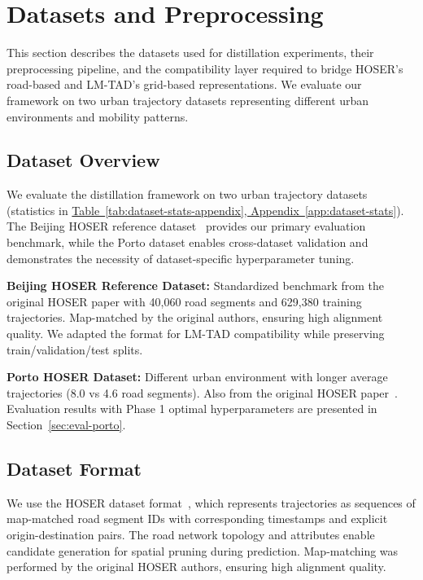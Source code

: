 
\section{Datasets and Preprocessing}
\label{sec:data-preprocessing}

This section describes the datasets used for distillation experiments, their preprocessing pipeline, and the compatibility layer required to bridge HOSER's road-based and LM-TAD's grid-based representations. We evaluate our framework on two urban trajectory datasets representing different urban environments and mobility patterns.

\subsection{Dataset Overview}
\label{sec:data-overview}

We evaluate the distillation framework on two urban trajectory datasets (statistics in \hyperref[app:dataset-stats]{Table~\ref*{tab:dataset-stats-appendix}, Appendix~\ref*{app:dataset-stats}}). The Beijing HOSER reference dataset~\cite{caoHolisticSemanticRepresentation2025} provides our primary evaluation benchmark, while the Porto dataset enables cross-dataset validation and demonstrates the necessity of dataset-specific hyperparameter tuning.

\textbf{Beijing HOSER Reference Dataset:} Standardized benchmark from the original HOSER paper with 40,060 road segments and 629,380 training trajectories. Map-matched by the original authors, ensuring high alignment quality. We adapted the format for LM-TAD compatibility while preserving train/validation/test splits.

\textbf{Porto HOSER Dataset:} Different urban environment with longer average trajectories (8.0 vs 4.6 road segments). Also from the original HOSER paper~\cite{caoHolisticSemanticRepresentation2025}. Evaluation results with Phase 1 optimal hyperparameters are presented in Section~\ref{sec:eval-porto}.

\subsection{Dataset Format}
\label{sec:data-format}

We use the HOSER dataset format~\cite{caoHolisticSemanticRepresentation2025}, which represents trajectories as sequences of map-matched road segment IDs with corresponding timestamps and explicit origin-destination pairs. The road network topology and attributes enable candidate generation for spatial pruning during prediction. Map-matching was performed by the original HOSER authors, ensuring high alignment quality.


